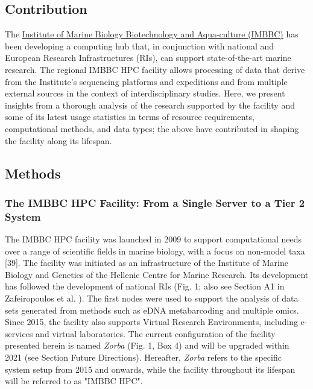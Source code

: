    \subsection{Contribution}

   The \href{https://imbbc.hcmr.gr/}{Institute of Marine Biology Biotechnology and Aqua-culture (IMBBC)} 
   has been developing a computing hub that, in conjunction with national and European Research Infrastructures (RIs), 
   can support state-of-the-art marine research. 
   The regional IMBBC HPC facility allows processing of data that derive from the Institute's sequencing platforms 
   and expeditions and from multiple external sources in the context of interdisciplinary studies. 
   Here, we present insights from a thorough analysis of the research supported by the facility and some 
   of its latest usage statistics in terms of resource requirements, computational methods, and data types; 
   the above have contributed in shaping the facility along its lifespan.


   \subsection{Methods}

   \subsubsection*{The IMBBC HPC Facility: From a Single Server to a Tier 2 System}

   The IMBBC HPC facility was launched in 2009 to support computational needs over a range of scientific 
   fields in marine biology, with a focus on non-model taxa [39]. 
   The facility was initiated as an infrastructure of the Institute of Marine Biology and Genetics of 
   the Hellenic Centre for Marine Research.
   Its development has followed the development of national RIs (Fig. 1; 
   also see Section A1 in Zafeiropoulos et al. \citep{haris_zafeiropoulos_2021_4665308}). 
   The first nodes were used to support the analysis of data sets generated from methods such as eDNA metabarcoding and multiple omics. 
   Since 2015, the facility also supports Virtual Research Environments, including e-services and virtual laboratories. 
   The current configuration of the facility presented herein is named \textit{Zorba} (Fig. 1, Box 4) and will be upgraded within 2021 (see Section Future Directions). 
   Hereafter, \textit{Zorba} refers to the specific system setup from 2015 and onwards, while the facility throughout its lifespan will be referred to as "IMBBC HPC".

